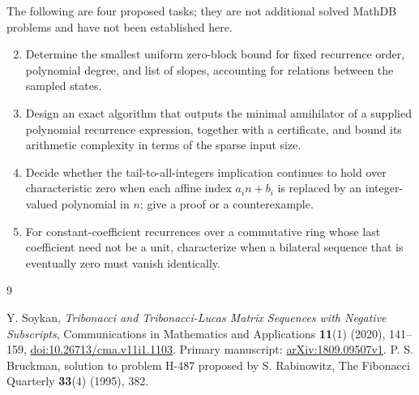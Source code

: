 \documentclass[11pt]{article}
\begin{document}
The following are four proposed tasks; they are not additional solved
MathDB problems and have not been established here.
\begin{enumerate}
\setcounter{enumi}{1}
\item Determine the smallest uniform zero-block bound for fixed
recurrence order, polynomial degree, and list of slopes, accounting for
relations between the sampled states.
\item Design an exact algorithm that outputs the minimal annihilator
of a supplied polynomial recurrence expression, together with a certificate,
and bound its arithmetic complexity in terms of the sparse input size.
\item Decide whether the tail-to-all-integers implication continues to hold
over characteristic zero when each affine index $a_i n+b_i$ is replaced
by an integer-valued polynomial in $n$; give a proof or a counterexample.
\item For constant-coefficient recurrences over a commutative ring whose
last coefficient need not be a unit, characterize when a bilateral sequence
that is eventually zero must vanish identically.
\end{enumerate}

\begin{thebibliography}{9}
\raggedright
{} Y. Soykan, \emph{Tribonacci and Tribonacci-Lucas Matrix
Sequences with Negative Subscripts}, Communications in Mathematics and
Applications \textbf{11}(1) (2020), 141--159,
\href{https://doi.org/10.26713/cma.v11i1.1103}{doi:10.26713/cma.v11i1.1103}.
Primary manuscript: \href{https://arxiv.org/abs/1809.09507}{arXiv:1809.09507v1}.
 P. S. Bruckman, solution to problem H-487 proposed by
S. Rabinowitz, The Fibonacci Quarterly \textbf{33}(4) (1995), 382.
\end{thebibliography}
\end{document}
